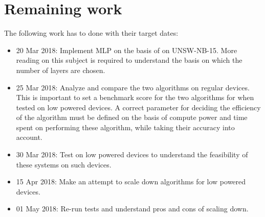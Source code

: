 \documentclass[a4paper,12pt]{article}
\begin{document}
    \section{Remaining work}
        The following work has to done with their target dates:
        \begin{itemize}
            \item 20 Mar 2018: Implement MLP on the basis of \cite{mlp17} on UNSW-NB-15. More reading on this subject is required to understand the basis on which the number of layers are chosen.
            \item 25 Mar 2018: Analyze and compare the two algorithms on regular devices. This is important to set a benchmark score for the two algorithms for when tested on low powered devices. A correct parameter for deciding the efficiency of the algorithm must be defined on the basis of compute power and time spent on performing these algorithm, while taking their accuracy into account.
            \item 30 Mar 2018: Test on low powered devices to understand the feasibility of these systems on such devices.
            \item 15 Apr 2018: Make an attempt to scale down algorithms for low powered devices.
            \item 01 May 2018: Re-run tests and understand pros and cons of scaling down.
        \end{itemize}

	
	
	
\end{document}
